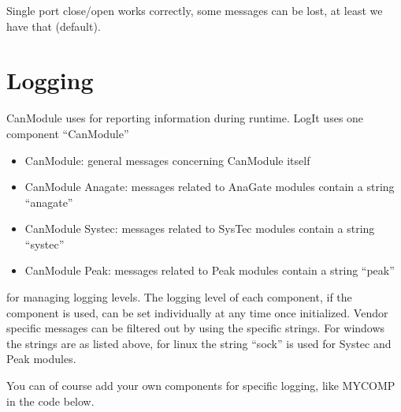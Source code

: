 \documentclass[a4paper,10pt,english]{sphinxmanual}
\begin{document}
\sphinxAtStartPar
Single port close/open works correctly, some messages can be lost, at least we have that (default).


\chapter{Logging}
\label{\detokenize{logging:logging}}\label{\detokenize{logging::doc}}
\sphinxAtStartPar
CanModule uses  for reporting information during runtime. LogIt uses one component “CanModule”
\begin{itemize}
\item {} 
\sphinxAtStartPar
CanModule: general messages concerning CanModule itself

\item {} 
\sphinxAtStartPar
CanModule Anagate: messages related to AnaGate modules contain a string “anagate”

\item {} 
\sphinxAtStartPar
CanModule Systec: messages related to SysTec modules contain a string “systec”

\item {} 
\sphinxAtStartPar
CanModule Peak: messages related to Peak modules contain a string “peak”

\end{itemize}

\sphinxAtStartPar
for managing logging levels. The logging level of each component, if the component is used, can be set individually
at any time once initialized. Vendor specific messages can be filtered out by using the specific strings.
For windows the strings are as listed above, for linux the string “sock” is used for Systec and Peak modules.

\sphinxAtStartPar
You can of course add your own components for specific logging, like MYCOMP in the code below.

\sphinxAtStartPar
{}
\end{document}
